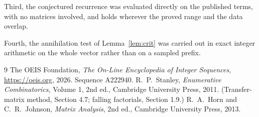 \documentclass[11pt,a4paper]{article}
\theoremstyle{plain}
\theoremstyle{definition}
\begin{document}
Third, the conjectured recurrence was evaluated directly on the published terms, with no
matrices involved, and holds wherever the proved range and the data overlap.

Fourth, the annihilation test of Lemma~\ref{lem:crit} was carried out in exact integer
arithmetic on the whole vector rather than on a sampled prefix.

\begin{thebibliography}{9}
 The OEIS Foundation, \emph{The On-Line Encyclopedia of Integer
Sequences}, \url{https://oeis.org}, 2026. Sequence A222940.
 R.~P.~Stanley, \emph{Enumerative Combinatorics}, Volume 1, 2nd ed.,
Cambridge University Press, 2011. (Transfer-matrix method, Section 4.7; falling factorials,
Section 1.9.)
 R.~A.~Horn and C.~R.~Johnson, \emph{Matrix Analysis}, 2nd ed., Cambridge
University Press, 2013.
\end{thebibliography}
\end{document}
